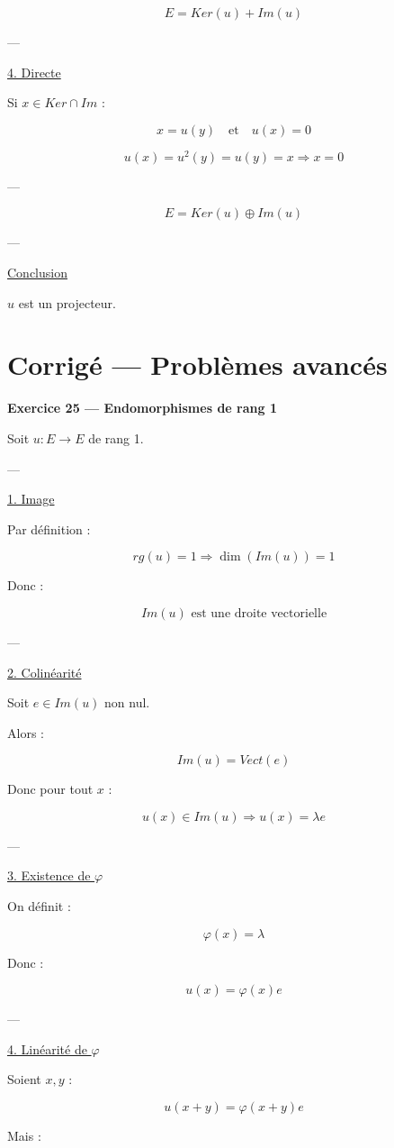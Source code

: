 \documentclass[11pt,a4paper]{article}
\begin{document}
\[
E = Ker(u) + Im(u)
\]

---

\underline{4. Directe}

Si $x \in Ker \cap Im$ :

\[
x=u(y)
\quad \text{et} \quad u(x)=0
\]

\[
u(x)=u^2(y)=u(y)=x
\Rightarrow x=0
\]

---

\[
\boxed{E=Ker(u)\oplus Im(u)}
\]

---

\underline{Conclusion}

$u$ est un projecteur.


\section{Corrigé — Problèmes avancés}

\textbf{Exercice 25 — Endomorphismes de rang 1}

Soit $u : E \to E$ de rang 1.

---

\underline{1. Image}

Par définition :

\[
rg(u)=1 \Rightarrow \dim(Im(u))=1
\]

Donc :

\[
\boxed{Im(u) \text{ est une droite vectorielle}}
\]

---

\underline{2. Colinéarité}

Soit $e \in Im(u)$ non nul.

Alors :

\[
Im(u)=Vect(e)
\]

Donc pour tout $x$ :

\[
u(x) \in Im(u) \Rightarrow u(x)=\lambda e
\]

---

\underline{3. Existence de $\varphi$}

On définit :

\[
\varphi(x)=\lambda
\]

Donc :

\[
\boxed{u(x)=\varphi(x)e}
\]

---

\underline{4. Linéarité de $\varphi$}

Soient $x,y$ :

\[
u(x+y)=\varphi(x+y)e
\]

Mais :
\end{document}
